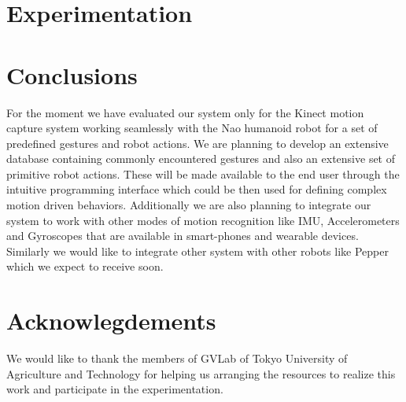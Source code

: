 \documentclass{llncs}
\begin{document}
\section{Experimentation}
%
%
\section{Conclusions}
%
For the moment we have evaluated our system only for the Kinect motion capture system working seamlessly with the Nao humanoid robot for a set of predefined gestures and robot actions. We are planning to develop an extensive database containing commonly encountered gestures and also an extensive set of primitive robot actions. These will be made available to the end user through the intuitive programming interface which could be then used for defining complex motion driven behaviors. Additionally we are also planning to integrate our system to work with other modes of motion recognition like IMU, Accelerometers and Gyroscopes that are available in smart-phones and wearable devices. Similarly we would like to integrate other system with other robots like Pepper which we expect to receive soon.
%
\section{Acknowlegdements}
%
		We would like to thank the members of GVLab of Tokyo University of Agriculture and Technology for helping us arranging the resources to realize this work and participate in the experimentation.
%
%
%


%
%
%
%

\end{document}
